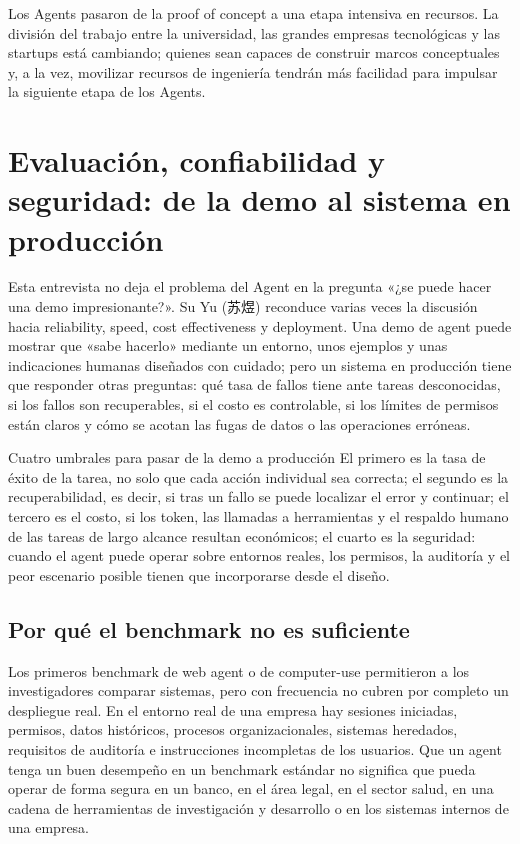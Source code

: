 \documentclass[a4paper]{article}
\begin{document}
Los Agents pasaron de la proof of concept a una etapa intensiva en recursos. La división del trabajo entre la universidad, las grandes empresas tecnológicas y las startups está cambiando; quienes sean capaces de construir marcos conceptuales y, a la vez, movilizar recursos de ingeniería tendrán más facilidad para impulsar la siguiente etapa de los Agents.
\section{Evaluación, confiabilidad y seguridad: de la demo al sistema en producción}

Esta entrevista no deja el problema del Agent en la pregunta «¿se puede hacer una demo impresionante?». Su Yu (苏煜) reconduce varias veces la discusión hacia reliability, speed, cost effectiveness y deployment. Una demo de agent puede mostrar que «sabe hacerlo» mediante un entorno, unos ejemplos y unas indicaciones humanas diseñados con cuidado; pero un sistema en producción tiene que responder otras preguntas: qué tasa de fallos tiene ante tareas desconocidas, si los fallos son recuperables, si el costo es controlable, si los límites de permisos están claros y cómo se acotan las fugas de datos o las operaciones erróneas.

\begin{importantbox}{Cuatro umbrales para pasar de la demo a producción}
El primero es la tasa de éxito de la tarea, no solo que cada acción individual sea correcta; el segundo es la recuperabilidad, es decir, si tras un fallo se puede localizar el error y continuar; el tercero es el costo, si los token, las llamadas a herramientas y el respaldo humano de las tareas de largo alcance resultan económicos; el cuarto es la seguridad: cuando el agent puede operar sobre entornos reales, los permisos, la auditoría y el peor escenario posible tienen que incorporarse desde el diseño.
\end{importantbox}

\subsection{Por qué el benchmark no es suficiente}

Los primeros benchmark de web agent o de computer-use permitieron a los investigadores comparar sistemas, pero con frecuencia no cubren por completo un despliegue real. En el entorno real de una empresa hay sesiones iniciadas, permisos, datos históricos, procesos organizacionales, sistemas heredados, requisitos de auditoría e instrucciones incompletas de los usuarios. Que un agent tenga un buen desempeño en un benchmark estándar no significa que pueda operar de forma segura en un banco, en el área legal, en el sector salud, en una cadena de herramientas de investigación y desarrollo o en los sistemas internos de una empresa.
\end{document}
